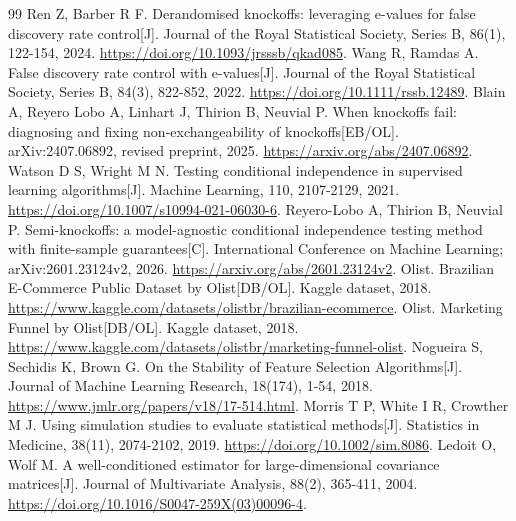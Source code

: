 \documentclass{sufethesismas}
\begin{document}
\begin{thebibliography}{99}
 Ren Z, Barber R F. Derandomised knockoffs: leveraging e-values for false discovery rate control[J]. Journal of the Royal Statistical Society, Series B, 86(1), 122-154, 2024. \url{https://doi.org/10.1093/jrsssb/qkad085}.
 Wang R, Ramdas A. False discovery rate control with e-values[J]. Journal of the Royal Statistical Society, Series B, 84(3), 822-852, 2022. \url{https://doi.org/10.1111/rssb.12489}.
 Blain A, Reyero Lobo A, Linhart J, Thirion B, Neuvial P. When knockoffs fail: diagnosing and fixing non-exchangeability of knockoffs[EB/OL]. arXiv:2407.06892, revised preprint, 2025. \url{https://arxiv.org/abs/2407.06892}.
 Watson D S, Wright M N. Testing conditional independence in supervised learning algorithms[J]. Machine Learning, 110, 2107-2129, 2021. \url{https://doi.org/10.1007/s10994-021-06030-6}.
 Reyero-Lobo A, Thirion B, Neuvial P. Semi-knockoffs: a model-agnostic conditional independence testing method with finite-sample guarantees[C]. International Conference on Machine Learning; arXiv:2601.23124v2, 2026. \url{https://arxiv.org/abs/2601.23124v2}.
 Olist. Brazilian E-Commerce Public Dataset by Olist[DB/OL]. Kaggle dataset, 2018. \url{https://www.kaggle.com/datasets/olistbr/brazilian-ecommerce}.
 Olist. Marketing Funnel by Olist[DB/OL]. Kaggle dataset, 2018. \url{https://www.kaggle.com/datasets/olistbr/marketing-funnel-olist}.
 Nogueira S, Sechidis K, Brown G. On the Stability of Feature Selection Algorithms[J]. Journal of Machine Learning Research, 18(174), 1-54, 2018. \url{https://www.jmlr.org/papers/v18/17-514.html}.
 Morris T P, White I R, Crowther M J. Using simulation studies to evaluate statistical methods[J]. Statistics in Medicine, 38(11), 2074-2102, 2019. \url{https://doi.org/10.1002/sim.8086}.
 Ledoit O, Wolf M. A well-conditioned estimator for large-dimensional covariance matrices[J]. Journal of Multivariate Analysis, 88(2), 365-411, 2004. \url{https://doi.org/10.1016/S0047-259X(03)00096-4}.
\end{thebibliography}
\end{document}
